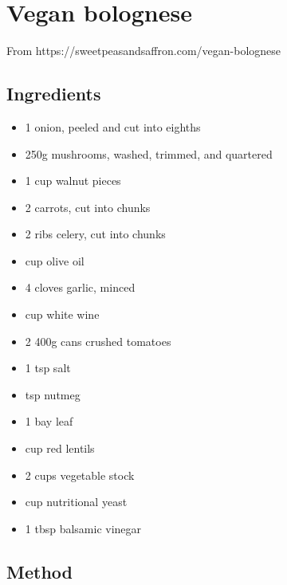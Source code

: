 \section{Vegan bolognese}



From https://sweetpeasandsaffron.com/vegan-bolognese

\subsection{Ingredients}

\begin{itemize}
	\item 1 onion, peeled and cut into eighths
    \item 250g mushrooms, washed, trimmed, and quartered
    \item 1 cup walnut pieces
    \item 2 carrots, cut into chunks
    \item 2 ribs celery, cut into chunks
    \item {} cup olive oil
    \item 4 cloves garlic, minced
    \item {} cup white wine
    \item 2 400g cans crushed tomatoes
    \item 1 tsp salt
    \item {} tsp nutmeg
    \item 1 bay leaf
    \item {} cup red lentils
    \item 2 cups vegetable stock
    \item {} cup nutritional yeast
    \item 1 tbsp balsamic vinegar
\end{itemize}

\subsection{Method}

